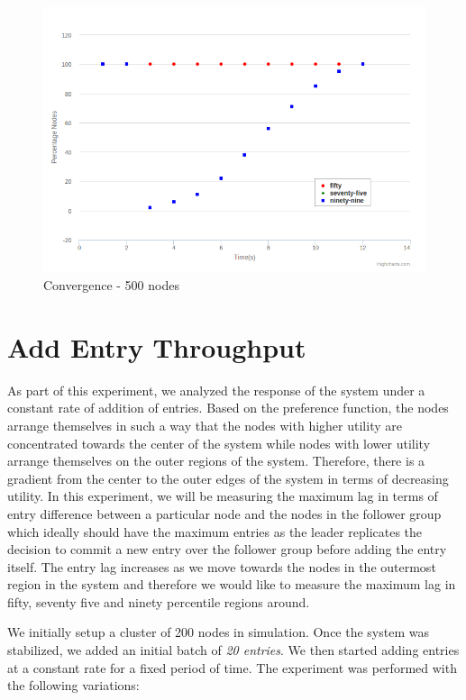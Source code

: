 \documentclass[a4paper,11pt]{kth-mag}
\begin{document}
\begin{figure}
	\includegraphics[scale=0.5]{500Convergence}
	\caption{Convergence - 500 nodes}
	\label{fig:500conv}
\end{figure}


\section{Add Entry Throughput}

As part of this experiment, we analyzed the response of the system under a constant rate of addition of entries. Based on the preference function, the nodes arrange themselves in such a way that the nodes with higher utility are concentrated towards the center of the system while nodes with lower utility arrange themselves on the outer regions of the system. Therefore, there is a gradient from the center to the outer edges of the system in terms of decreasing utility. In this experiment, we will be measuring the maximum lag in terms of entry difference between a particular node and the nodes in the follower group which ideally should have the maximum entries as the leader replicates the decision to commit a new entry over the follower group before adding the entry itself. The entry lag increases as we move towards the nodes in the outermost region in the system and therefore we would like to measure the maximum lag in fifty, seventy five and ninety percentile regions around.

\par We initially setup a cluster of 200 nodes in simulation. Once the system was stabilized, we added an initial batch of \textit{20 entries}. We then started adding entries at a constant rate for a fixed period of time. The experiment was performed  with the following variations:
\end{document}
